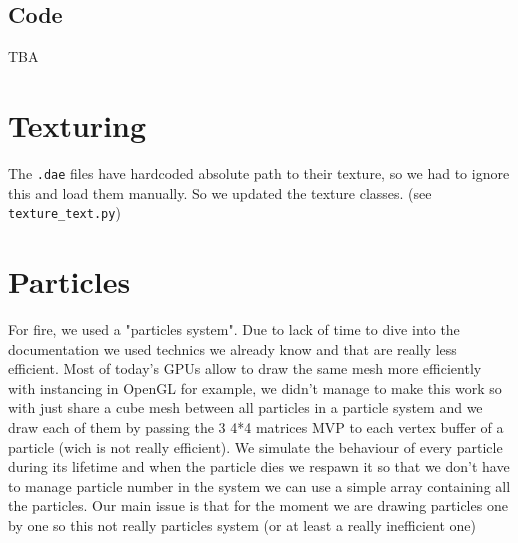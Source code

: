 \documentclass[11pt]{article}
\begin{document}
\subsection*{Code}
TBA

\section{Texturing}
\noindent The \texttt{.dae} files have hardcoded absolute path to their texture, so we had to ignore this and load them manually. So we updated the texture classes. (see \texttt{texture\_text.py})

\section{Particles}
\noindent For fire, we used a "particles system". Due to lack of time to dive into the documentation we used technics we already know and that are really less efficient. Most of today's GPUs allow to draw the same mesh more efficiently with instancing in OpenGL for example, we didn't manage to make this work so with just share a cube mesh between all particles in a particle system and we draw each of them by passing the 3 4*4 matrices MVP to each vertex buffer of a particle (wich is not really efficient). We simulate the behaviour of every particle during its lifetime and when the particle dies we respawn it so that we don't have to manage particle number in the system we can use a simple array containing all the particles.
\noindent Our main issue is that for the moment we are drawing particles one by one so this not really particles system (or at least a really inefficient one)
\end{document}
